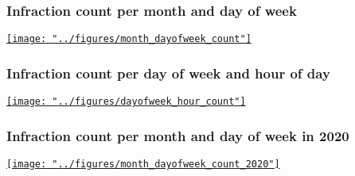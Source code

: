 \documentclass[fleqn]{beamer}
\begin{document}
\begin{frame}
  \frametitle{Infraction count per month and day of week}
  \centering
  \href{https://sariaslaso.github.io/parking_toronto/figures/month_dayofweek_count.html}{\texttt{[image: "../figures/month\_dayofweek\_count"]}}
\end{frame}

\begin{frame}
  \frametitle{Infraction count per day of week and hour of day}
  \centering
  \href{https://sariaslaso.github.io/parking_toronto/figures/dayofweek_hour_count.html}{\texttt{[image: "../figures/dayofweek\_hour\_count"]}} 
\end{frame}

\begin{frame}
  \frametitle{Infraction count per month and day of week in 2020}
  \centering
  \href{https://sariaslaso.github.io/parking_toronto/figures/month_dayofweek_count_2020.html}{\texttt{[image: "../figures/month\_dayofweek\_count\_2020"]}} 
\end{frame}
\end{document}
